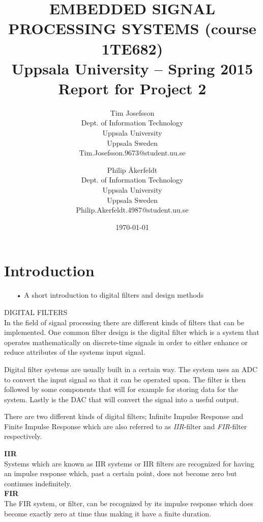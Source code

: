 \documentclass[a4paper,11pt]{article}
\title{\textbf{EMBEDDED SIGNAL PROCESSING SYSTEMS (course 1TE682) \\
    Uppsala University -- Spring 2015 \\
    Report for Project 2  }}
\author{
Tim Josefsson\\
\textup{Dept. of Information Technology}\\
\textup{Uppsala University}\\
\textup{Uppsala Sweden}\\
\textup{Tim.Josefsson.9673@student.uu.se}
\and
Philip Åkerfeldt\\
\textup{Dept. of Information Technology}\\
\textup{Uppsala University}\\
\textup{Uppsala Sweden}\\
\textup{Philip.Akerfeldt.4987@student.uu.se}
}
\date{\today}
\begin{document}
\maketitle
\newpage
\tableofcontents
\pagebreak


\section{Introduction}
\begin{enumerate}
\item[•] A short introduction to digital filters and design methods
\end{enumerate}

DIGITAL FILTERS\\
In the field of signal processing there are different kinds of filters that can be implemented. One common filter design is the digital filter which is a system that operates mathematically on discrete-time signals in order to either enhance or reduce attributes of the systems input signal. 

Digital filter systems are usually built in a certain way. The system uses an ADC to convert the input signal so that it can be operated upon. The filter is then followed by some components that will for example for storing data for the system. Lastly is the DAC that will convert the signal into a useful output.

There are two different kinds of digital filters; Infinite Impulse Response and Finite Impulse Response which are also referred to as \textit{IIR}-filter and \textit{FIR}-filter respectively.

\textbf{IIR}\\
Systems which are known as IIR systems or IIR filters are recognized for having an impulse response which, past a certain point, does not become zero but continues indefinitely.\\

\textbf{FIR}\\
The FIR system, or filter, can be recognized by its impulse response which does become exactly zero at time thus making it have a finite duration.\\ 
\end{document}
